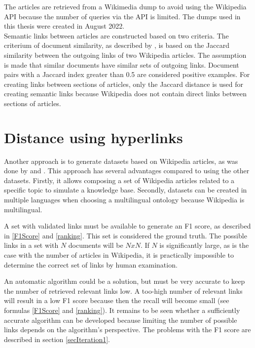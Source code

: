 The articles are retrieved from a Wikimedia dump to avoid using the Wikipedia API because the number of queries via the API is limited. The dumps used in this thesis were created in August 2022.
\\

 Semantic links between articles are constructed based on two criteria. The criterium of document similarity, as described by \citet{jiang2019semantic}, is based on the Jaccard similarity \citep{Jaccard1912} between the outgoing links of two Wikipedia articles. The assumption is made that similar documents have similar sets of outgoing links. Document pairs with a Jaccard index greater than 0.5 are considered positive examples. 
   For creating links between sections of articles, only the Jaccard distance is used for creating semantic links because Wikipedia does not contain direct links between sections of articles.



\section{Distance using hyperlinks}
\label{secHyperlinkDistance}
Another approach is to generate datasets based on Wikipedia articles, as was done by \citet{jiang2019semantic} and \citet{512Tokens}. This approach has several advantages compared to using the other datasets. Firstly, it allows composing a set of Wikipedia articles related to a specific topic to simulate a knowledge base. Secondly, datasets can be created in multiple languages when choosing a multilingual ontology because Wikipedia is multilingual. 


A set with validated links must be available to generate an F1 score, as described in \ref{F1Score} and \ref{ranking}. This set is considered the ground truth. The possible links in a set with $N$ documents will be $N x N$. If $N$ is significantly large, as is the case with the number of articles in Wikipedia, it is practically impossible to determine the correct set of links by human examination. 

An automatic algorithm could be a solution, but must be very accurate to keep the number of retrieved relevant links low. A too-high number of relevant links will result in a low F1 score because then the recall will become small (see formulas \ref{F1Score} and \ref{ranking}). It remains to be seen whether a sufficiently accurate algorithm can be developed because limiting the number of possible links depends on the algorithm’s perspective.
 The problems with the F1 score are described in section \ref{secIteration1}. 
 \\

